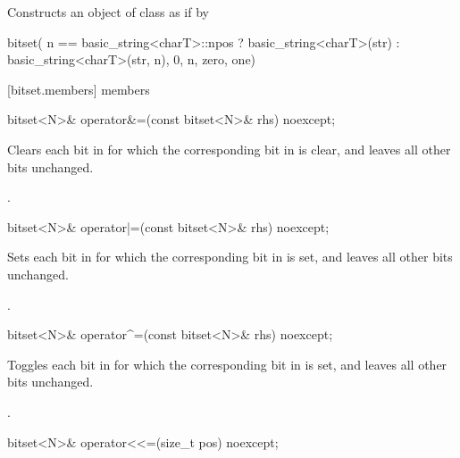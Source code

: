 \begin{itemdescr}
\pnum
\effects Constructs an object of class  as if by

\begin{codeblock}
bitset(
  n == basic_string<charT>::npos
    ? basic_string<charT>(str)
    : basic_string<charT>(str, n),
  0, n, zero, one)
\end{codeblock}

\end{itemdescr}


[bitset.members]{ members}

%
\begin{itemdecl}
bitset<N>& operator&=(const bitset<N>& rhs) noexcept;
\end{itemdecl}

\begin{itemdescr}
\pnum
\effects
Clears each bit in
for which the corresponding bit in  is clear, and leaves all other bits unchanged.

\pnum
\returns
{}.
\end{itemdescr}

%
\begin{itemdecl}
bitset<N>& operator|=(const bitset<N>& rhs) noexcept;
\end{itemdecl}

\begin{itemdescr}
\pnum
\effects
Sets each bit in
for which the corresponding bit in  is set, and leaves all other bits unchanged.

\pnum
\returns
{}.
\end{itemdescr}

%
\begin{itemdecl}
bitset<N>& operator^=(const bitset<N>& rhs) noexcept;
\end{itemdecl}

\begin{itemdescr}
\pnum
\effects
Toggles each bit in
for which the corresponding bit in  is set, and leaves all other bits unchanged.

\pnum
\returns
{}.
\end{itemdescr}

%
\begin{itemdecl}
bitset<N>& operator<<=(size_t pos) noexcept;
\end{itemdecl}

